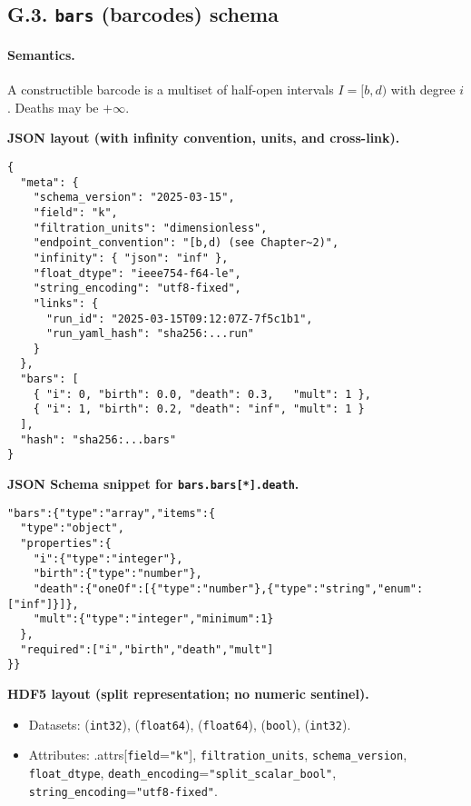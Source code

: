 \documentclass[11pt]{article}
\numberwithin{equation}{section}
\theoremstyle{definition}
\begin{document}
\subsection*{G.3. \texttt{bars} (barcodes) schema}
\paragraph{Semantics.} A constructible barcode is a multiset of half-open intervals \(I=[b,d)\) with degree \(i\).
Deaths may be \(+\infty\).

\noindent\textbf{JSON layout (with infinity convention, units, and cross-link).}
\begin{verbatim}
{
  "meta": {
    "schema_version": "2025-03-15",
    "field": "k",
    "filtration_units": "dimensionless",
    "endpoint_convention": "[b,d) (see Chapter~2)",
    "infinity": { "json": "inf" },
    "float_dtype": "ieee754-f64-le",
    "string_encoding": "utf8-fixed",
    "links": {
      "run_id": "2025-03-15T09:12:07Z-7f5c1b1",
      "run_yaml_hash": "sha256:...run"
    }
  },
  "bars": [
    { "i": 0, "birth": 0.0, "death": 0.3,   "mult": 1 },
    { "i": 1, "birth": 0.2, "death": "inf", "mult": 1 }
  ],
  "hash": "sha256:...bars"
}
\end{verbatim}

\noindent\textbf{JSON Schema snippet for \texttt{bars.bars[*].death}.}
\begin{verbatim}
"bars":{"type":"array","items":{
  "type":"object",
  "properties":{
    "i":{"type":"integer"},
    "birth":{"type":"number"},
    "death":{"oneOf":[{"type":"number"},{"type":"string","enum":["inf"]}]},
    "mult":{"type":"integer","minimum":1}
  },
  "required":["i","birth","death","mult"]
}}
\end{verbatim}

\noindent\textbf{HDF5 layout (split representation; no numeric sentinel).}
\begin{itemize}[leftmargin=*, itemsep=0.1em]
  \item Datasets:
     (\texttt{int32}),
     (\texttt{float64}),
     (\texttt{float64}),
     (\texttt{bool}),
     (\texttt{int32}).
  \item Attributes:
    .attrs[\texttt{field}=\texttt{"k"}],
    \texttt{filtration\_units},
    \texttt{schema\_version},
    \texttt{float\_dtype},
    \texttt{death\_encoding}=\texttt{"split\_scalar\_bool"},
    \texttt{string\_encoding}=\texttt{"utf8-fixed"}.
\end{itemize}
\end{document}
